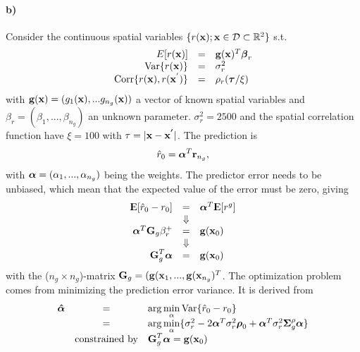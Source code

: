\paragraph{b)}
Consider the continuous spatial variables $\{r(\boldsymbol{\mathbf{x}}); \boldsymbol{\mathbf{x}} \in \mathcal{D} \subset \mathbb{R}^2\}$ s.t.
\begin{equation}
\begin{array}{rcl}
     E[r(\boldsymbol{\mathbf{x}})] & = & \boldsymbol{\mathbf{g}}(\boldsymbol{\mathbf{x}})^T\boldsymbol{\mathbf{\beta}}_r \\
     \mathrm{Var}\{r(\boldsymbol{\mathbf{x}})\} & = & \sigma_r^2 \\
     \mathrm{Corr}\{r(\boldsymbol{\mathbf{x}}),r(\boldsymbol{\mathbf{x}}^{'})\} & = & \rho_r(\boldsymbol{\mathbf{\tau}}/\xi)
\end{array}
\end{equation}
with $\boldsymbol{\mathbf{g}}(\boldsymbol{\mathbf{x}}) = (g_1(\boldsymbol{\mathbf{x}}), ... g_{n_g}(\boldsymbol{\mathbf{x}}))$ a vector of known spatial variables and $\beta_r = (\beta_1, ..., \beta_{n_g})$ an unknown parameter. $\sigma_r^2 = 2500$ and the spatial correlation function have $\xi = 100$ with $\tau = |\boldsymbol{\mathbf{x}} - \boldsymbol{\mathbf{x^{'}}}|$. The prediction is 
\begin{equation}
    \hat{r}_0 = \boldsymbol{\mathbf{\alpha}}^T\boldsymbol{\mathbf{r}}_{n_g},
\end{equation}
with $\boldsymbol{\mathbf{\alpha}} = (\alpha_1, ..., \alpha_{n_g})$ being the weights. 
The predictor error needs to be unbiased, which mean that the expected value of the error must be zero, giving
\begin{equation*}
\begin{array}{rcl}
    {\rm I\kern-.3em E}[\hat{r}_0 - r_0] & = & \boldsymbol{\mathbf{\alpha}}^T {\rm I\kern-.3em E}[r^g]\\
      & \Downarrow & \\
      \boldsymbol{\mathbf{\alpha}}^T \boldsymbol{\mathbf{G}}_g \beta_r^+ & = & \boldsymbol{\mathbf{g}}(\boldsymbol{\mathbf{x}}_0) \\
      & \Downarrow & \\
      \boldsymbol{\mathbf{G}}_g^T \boldsymbol{\mathbf{\alpha}} & = & \boldsymbol{\mathbf{g}}(\boldsymbol{\mathbf{x}}_0)
\end{array}
\end{equation*}
with the ($n_g \times n_g$)-matrix $\boldsymbol{\mathbf{G}}_g = (\boldsymbol{\mathbf{g}}(\boldsymbol{\mathbf{x}}_1,...,\boldsymbol{\mathbf{g}}(\boldsymbol{\mathbf{x}}_{n_g})^T$.
The optimization problem comes from minimizing the prediction error variance. It is derived from
\begin{equation*}
    \begin{array}{rcl}
        \boldsymbol{\mathbf{\hat{\alpha}}} & = & \arg\min\limits_\alpha \mathrm{Var}\{\hat{r}_0 - r_0\} \\
         & = & \arg\min\limits_\alpha\{\sigma_r^2 - 2\boldsymbol{\mathbf{\alpha}}^T\sigma_r^2\boldsymbol{\mathbf{\rho}}_0 + \boldsymbol{\mathbf{\alpha}}^T\sigma_r^2\boldsymbol{\mathbf{\Sigma}}_g^\rho \boldsymbol{\mathbf{\alpha}}\} \\
          & \textrm{constrained by} & \boldsymbol{\mathbf{G}}_g^T \boldsymbol{\mathbf{\alpha}} = \boldsymbol{\mathbf{g}}(\boldsymbol{\mathbf{x}}_0)
    \end{array}
\end{equation*}
